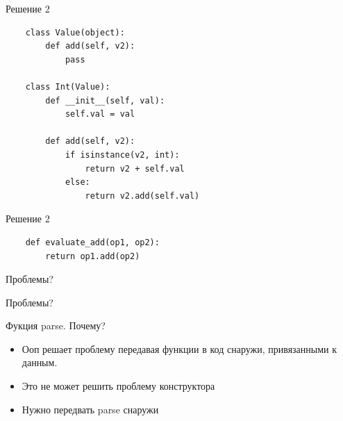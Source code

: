 \documentclass{article}
\begin{document}
\begin{center} Решение 2 \end{center}
\begin{lstlisting}
    class Value(object):
        def add(self, v2):
            pass

    class Int(Value):
        def __init__(self, val):
            self.val = val

        def add(self, v2):
            if isinstance(v2, int):
                return v2 + self.val
            else:
                return v2.add(self.val)
\end{lstlisting}
\newpage

\begin{center} Решение 2 \end{center}
\begin{lstlisting}
    def evaluate_add(op1, op2):
        return op1.add(op2)
\end{lstlisting}
\newpage

\begin{center} Проблемы? \end{center}
\newpage

\begin{center} Проблемы? \end{center}
Фукция parse. Почему?
\newpage

\begin{itemize}
    \item Ооп решает проблему передавая функции в код снаружи, привязанными к данным.
    \item Это не может решить проблему конструктора
    \item Нужно передвать parse снаружи
\end{itemize}
\newpage
\end{document}
